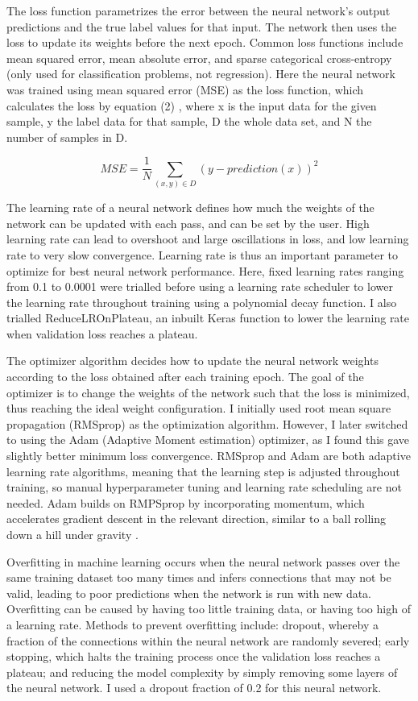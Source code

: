 \documentclass[11pt, a4paper]{article}
\begin{document}
The loss function parametrizes the error between the neural network's output predictions and the true label values for that input. The network then uses the loss to update its weights before the next epoch.  Common loss functions include mean squared error, mean absolute error, and sparse categorical cross-entropy (only used for classification problems, not regression). Here the neural network was trained using mean squared error (MSE) as the loss function, which calculates the loss by equation (2) \cite{keras},  where x is the input data for the given sample,  y the label data for that sample,  D the whole data set, and N the number of samples in D.

\begin{equation}
	MSE = \frac{1}{N}\sum_{(x, y)\in D}(y - prediction(x))^2
\end{equation}

The learning rate of a neural network defines how much the weights of the network can be updated with each pass, and can be set by the user. High learning rate can lead to overshoot and large oscillations in loss, and low learning rate to very slow convergence. Learning rate is thus an important parameter to optimize for best neural network performance. Here,  fixed learning rates ranging from 0.1 to 0.0001 were trialled before using a learning rate scheduler to lower the learning rate throughout training using a polynomial decay function.  I also trialled ReduceLROnPlateau, an inbuilt Keras function to lower the learning rate when validation loss reaches a plateau.

The optimizer algorithm decides how to update the neural network weights according to the loss obtained after each training epoch. The goal of the optimizer is to change the weights of the network such that the loss is minimized,  thus reaching the ideal weight configuration. I initially used root mean square propagation (RMSprop) as the optimization algorithm. However, I later switched to using the Adam (Adaptive Moment estimation) optimizer, as I found this gave slightly better minimum loss convergence.  RMSprop and Adam are both adaptive learning rate algorithms,  meaning that the learning step is adjusted throughout training,  so manual hyperparameter tuning and learning rate scheduling are not needed.  Adam builds on RMPSprop by incorporating momentum, which accelerates gradient descent in the relevant direction, similar to a ball rolling down a hill under gravity \cite{optimizers}.

Overfitting in machine learning occurs when the neural network passes over the same training dataset too many times and infers connections that may not be valid, leading to poor predictions when the network is run with new data.  Overfitting can be caused by having too little training data, or having too high of a learning rate.  Methods to prevent overfitting include: dropout, whereby a fraction of the connections within the neural network are randomly severed; early stopping, which halts the training process once the validation loss reaches a plateau; and reducing the model complexity by simply removing some layers of the neural network.  I used a dropout fraction of 0.2 for this neural network.
\end{document}

